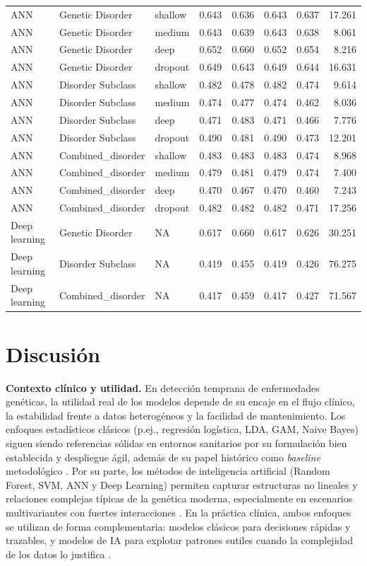 \documentclass[11pt,a4paper,spanish]{book}
\numberwithin{equation}{chapter}
\numberwithin{figure}{chapter}
\begin{document}
\begin{table}[htbp]
\begin{tabular}{l l l r r r r r}
ANN & Genetic Disorder & shallow & 0.643 & 0.636 & 0.643 & 0.637 & 17.261 \\
ANN & Genetic Disorder & medium & 0.643 & 0.639 & 0.643 & 0.638 & 8.061 \\
ANN & Genetic Disorder & deep & 0.652 & 0.660 & 0.652 & 0.654 & 8.216 \\
ANN & Genetic Disorder & dropout & 0.649 & 0.643 & 0.649 & 0.644 & 16.631 \\
ANN & Disorder Subclass & shallow & 0.482 & 0.478 & 0.482 & 0.474 & 9.614 \\
ANN & Disorder Subclass & medium & 0.474 & 0.477 & 0.474 & 0.462 & 8.036 \\
ANN & Disorder Subclass & deep & 0.471 & 0.483 & 0.471 & 0.466 & 7.776 \\
ANN & Disorder Subclass & dropout & 0.490 & 0.481 & 0.490 & 0.473 & 12.201 \\
ANN & Combined\_disorder & shallow & 0.483 & 0.483 & 0.483 & 0.474 & 8.968 \\
ANN & Combined\_disorder & medium & 0.479 & 0.481 & 0.479 & 0.474 & 7.400 \\
ANN & Combined\_disorder & deep & 0.470 & 0.467 & 0.470 & 0.460 & 7.243 \\
ANN & Combined\_disorder & dropout & 0.482 & 0.482 & 0.482 & 0.471 & 17.256 \\
Deep learning & Genetic Disorder & NA & 0.617 & 0.660 & 0.617 & 0.626 & 30.251 \\
Deep learning & Disorder Subclass & NA & 0.419 & 0.455 & 0.419 & 0.426 & 76.275 \\
Deep learning & Combined\_disorder & NA & 0.417 & 0.459 & 0.417 & 0.427 & 71.567 \\
\bottomrule
\end{tabular}
\end{table}

\section{Discusión}

\textbf{Contexto clínico y utilidad.} En detección temprana de enfermedades genéticas, la utilidad real de los modelos depende de su encaje en el flujo clínico, la estabilidad frente a datos heterogéneos y la facilidad de mantenimiento. Los enfoques estadísticos clásicos (p.ej., regresión logística, LDA, GAM, Naive Bayes) siguen siendo referencias sólidas en entornos sanitarios por su formulación bien establecida y despliegue ágil, además de su papel histórico como \emph{baseline} metodológico \cite{hosmer_2013,Hastie1986,10.1093/eurheartj/ehu207}. Por su parte, los métodos de inteligencia artificial (Random Forest, SVM, ANN y Deep Learning) permiten capturar estructuras no lineales y relaciones complejas típicas de la genética moderna, especialmente en escenarios multivariantes con fuertes interacciones \cite{Breiman2001,cortes1995,suykens1999,Libbrecht2015,LeCun_2015}. En la práctica clínica, ambos enfoques se utilizan de forma complementaria: modelos clásicos para decisiones rápidas y trazables, y modelos de IA para explotar patrones sutiles cuando la complejidad de los datos lo justifica \cite{Libbrecht2015,topol2019}.
\end{document}
